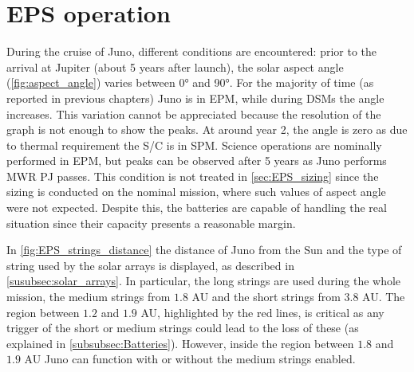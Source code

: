 \section{EPS operation}
\label{sec:eps_ops}

During the cruise of Juno, different conditions are encountered: prior to the arrival at Jupiter (about 5 years after launch), the solar aspect angle (\autoref{fig:aspect_angle}) varies between 0° and 90°.
For the majority of time (as reported in previous chapters) Juno is in EPM, while during DSMs the angle increases.
This variation cannot be appreciated because the resolution of the graph is not enough to show the peaks.
At around year 2, the angle is zero as due to thermal requirement the S/C is in SPM.
Science operations are nominally performed in EPM, but peaks can be observed after 5 years as Juno performs MWR PJ passes.
This condition is not treated in \autoref{sec:EPS_sizing} since the sizing is conducted on the nominal mission, where such values of aspect angle were not expected. Despite this, the batteries are capable of handling the real situation since their capacity presents a reasonable margin.

In \autoref{fig:EPS_strings_distance} the distance of Juno from the Sun and the type of string used by the solar arrays is displayed, as described in \autoref{susubsec:solar_arrays}.
In particular, the long strings are used during the whole mission, the medium strings from $1.8$ AU and the short strings from $3.8$ AU.
The region between $1.2$ and $1.9$ AU, highlighted by the red lines, is critical as any trigger of the short or medium strings could lead to the loss of these (as explained in \autoref{subsubsec:Batteries}). However, inside the region between $1.8$ and $1.9$ AU Juno can function with or without the medium strings enabled.\cite{solar_panels_coef}

